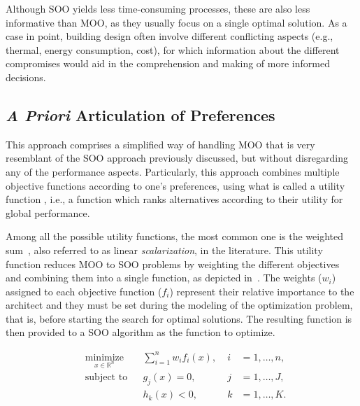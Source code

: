 	Although \ac{SOO} yields less time-consuming processes, these are also less informative than \ac{MOO}, as they usually focus on a single optimal solution. As a case in point, building design often involve different conflicting aspects (e.g., thermal, energy consumption, cost), for which information about the different compromises would aid in the comprehension and making of more informed decisions.
	
	\subsection{\textit{A Priori} Articulation of Preferences}
	\label{ssec:preferencesarticulation}
	
	This approach comprises a simplified way of handling \ac{MOO} that is very resemblant of the \ac{SOO} approach previously discussed, but without disregarding any of the performance aspects. Particularly, this approach combines multiple objective functions according to one’s preferences, using what is called a utility function \cite{Marler2004}, i.e., a function which ranks alternatives according to their utility for global performance. 
	
	Among all the possible utility functions, the most common one is the weighted sum~\cite{Wortmann2017Opossum}, also referred to as linear \textit{scalarization}, in the literature. This utility function reduces \ac{MOO} to \ac{SOO} problems by weighting the different objectives and combining them into a single function, as depicted in~. The weights ($w_i$) assigned to each objective function ($f_i$) represent their relative importance to the architect and they must be set during the modeling of the optimization problem, that is, before starting the search for optimal solutions. The resulting function is then provided to a \ac{SOO} algorithm as the function to optimize. 
	
	\begin{equation} \label{eq:scalarization}
	\begin{aligned}
	& \underset{x \in \mathbb{R}^n}{\text{minimize}}
	& & \sum_{i=1}^n w_i f_i(x), & \; i &= 1, \ldots, n, \\
	& \text{subject to}
	& & g_j(x) = 0, & \; j &= 1, \ldots, J, \\ 
	&&& h_k(x) < 0, & \; k &= 1, \ldots, K.
	\end{aligned}
	\end{equation}
	
